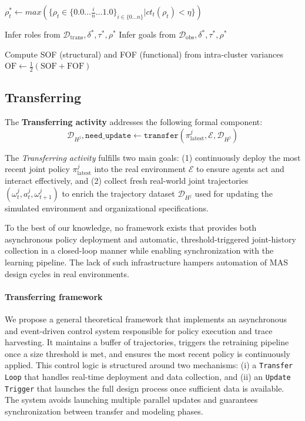 \documentclass[pdflatex,sn-mathphys-num]{sn-jnl}%
\theoremstyle{thmstyleone}%
\theoremstyle{thmstyletwo}%
\theoremstyle{thmstylethree}%
\begin{document}
\begin{algorithm}[H]
{        
        $\rho_t^* \gets max(\{\rho_t \in \{0.0\dots\frac{i}{n}\dots1.0\}_{i \in \{0\dots n\}} | ct_t(\rho_t) < \eta \})$ 

    }

    Infer roles from $\mathcal{D}_{\text{trans}}, \delta^*, \tau^*, \rho^*$ \;
    Infer goals from $\mathcal{D}_{\text{obs}}, \delta^*, \tau^*, \rho^*$ \;

    Compute SOF (structural) and FOF (functional) from intra-cluster variances \;
    $\text{OF} \gets \frac{1}{2}(\text{SOF} + \text{FOF})$ \;

\end{algorithm}


\subsection{Transferring}\label{sec:transferring}

\noindent The \textbf{Transferring activity} addresses the following formal component:
\[
\mathcal{D}_{H^j}, \texttt{need\_update} \gets \texttt{transfer}(\pi^j_{\text{latest}}, \mathcal{E}, \mathcal{D}_{H^j})
\]

The \textit{Transferring activity} fulfills two main goals: (1) continuously deploy the most recent joint policy $\pi^j_{\text{latest}}$ into the real environment $\mathcal{E}$ to ensure agents act and interact effectively, and (2) collect fresh real-world joint trajectories $(\omega^j_t, a^j_t, \omega^j_{t+1})$ to enrich the trajectory dataset $\mathcal{D}_{H^j}$ used for updating the simulated environment and organizational specifications.

To the best of our knowledge, no framework exists that provides both asynchronous policy deployment and automatic, threshold-triggered joint-history collection in a closed-loop manner while enabling synchronization with the learning pipeline. The lack of such infrastructure hampers automation of MAS design cycles in real environments.

\paragraph{Transferring framework}
We propose a general theoretical framework that implements an asynchronous and event-driven control system responsible for policy execution and trace harvesting. It maintains a buffer of trajectories, triggers the retraining pipeline once a size threshold is met, and ensures the most recent policy is continuously applied. This control logic is structured around two mechanisms:
(i) a \texttt{Transfer Loop} that handles real-time deployment and data collection, and
(ii) an \texttt{Update Trigger} that launches the full design process once sufficient data is available. The system avoids launching multiple parallel updates and guarantees synchronization between transfer and modeling phases.
\end{document}
